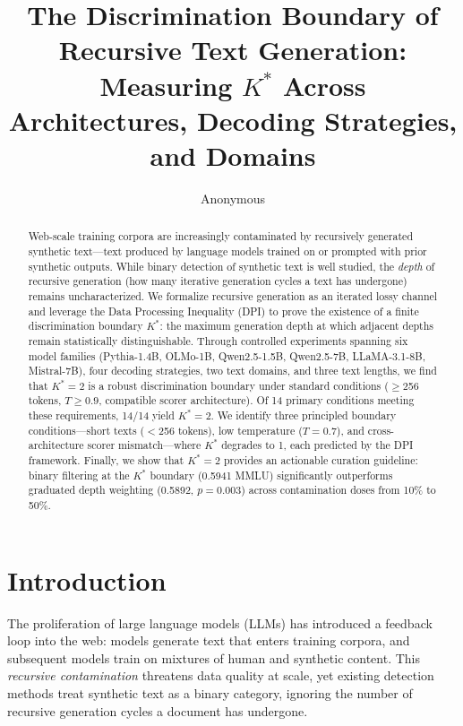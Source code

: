 \documentclass[11pt]{article}
\title{The Discrimination Boundary of Recursive Text Generation:\\
  Measuring $K^{*}$ Across Architectures, Decoding Strategies, and Domains}
\author{Anonymous}
\date{}
\newcommand{\kstar}{K^{*}}
\begin{document}
\maketitle

\begin{abstract}
Web-scale training corpora are increasingly contaminated by recursively generated synthetic text---text produced by language models trained on or prompted with prior synthetic outputs. While binary detection of synthetic text is well studied, the \emph{depth} of recursive generation (how many iterative generation cycles a text has undergone) remains uncharacterized. We formalize recursive generation as an iterated lossy channel and leverage the Data Processing Inequality (DPI) to prove the existence of a finite discrimination boundary $\kstar$: the maximum generation depth at which adjacent depths remain statistically distinguishable. Through controlled experiments spanning six model families (Pythia-1.4B, OLMo-1B, Qwen2.5-1.5B, Qwen2.5-7B, LLaMA-3.1-8B, Mistral-7B), four decoding strategies, two text domains, and three text lengths, we find that $\kstar = 2$ is a robust discrimination boundary under standard conditions ($\geq$256 tokens, $T \geq 0.9$, compatible scorer architecture). Of 14 primary conditions meeting these requirements, 14/14 yield $\kstar = 2$. We identify three principled boundary conditions---short texts ($<$256 tokens), low temperature ($T = 0.7$), and cross-architecture scorer mismatch---where $\kstar$ degrades to 1, each predicted by the DPI framework. Finally, we show that $\kstar = 2$ provides an actionable curation guideline: binary filtering at the $\kstar$ boundary (0.5941 MMLU) significantly outperforms graduated depth weighting (0.5892, $p = 0.003$) across contamination doses from 10\% to 50\%.
\end{abstract}

\section{Introduction}

The proliferation of large language models (LLMs) has introduced a feedback loop into the web: models generate text that enters training corpora, and subsequent models train on mixtures of human and synthetic content. This \emph{recursive contamination} threatens data quality at scale, yet existing detection methods treat synthetic text as a binary category, ignoring the number of recursive generation cycles a document has undergone.
\end{document}
